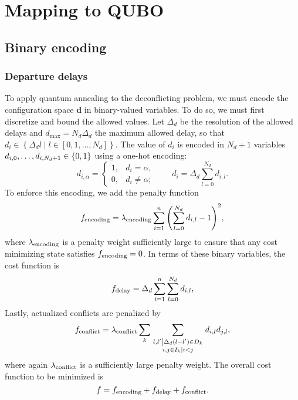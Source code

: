 \section{Mapping to QUBO}

\subsection{Binary encoding}

\subsubsection{Departure delays}
\label{sec:departure_delay_model}

To apply quantum annealing to the deconflicting problem, we must encode the configuration space $\mathbf d$ in binary-valued variables.
To do so, we must first discretize and bound the allowed values.
Let $\Delta_d$ be the resolution of the allowed delays and $d_{\max} = N_d \Delta_d$ the maximum allowed delay, so that $d_i \in \left\{\Delta_d l \middle| l \in [0, 1, \ldots, N_d]\right\}$.
The value of $d_i$ is encoded in $N_d + 1$ variables $d_{i,0}, \ldots, d_{i,N_d + 1} \in {\{0, 1\}}$ using a one-hot encoding:
\begin{equation}
d_{i, \alpha} = \begin{cases}
1, & d_i = \alpha,\\
0, & d_i \neq \alpha;
\end{cases}
\qquad
d_i = \Delta_d \sum_{l = 0}^{N_d} d_{i,l}.
\end{equation}
To enforce this encoding, we add the penalty function
\begin{equation}
f_{\mathrm{encoding}} = 
\lambda_{\mathrm{encoding}} 
\sum_{i = 1}^n 
{\left(
\sum_{l = 0}^{N_d} d_{i,l} - 1
\right)}^2,
\end{equation}
where $\lambda_{\mathrm{encoding}}$ is a penalty weight sufficiently large to ensure that any cost minimizing state satisfies $f_{\mathrm{encoding}} = 0$.
In terms of these binary variables, the cost function is 
\begin{equation}
f_{\mathrm{delay}} = 
\Delta_d
\sum_{i=1}^n 
\sum_{l=0}^{N_d} d_{i,l},
\end{equation}
Lastly, actualized conflicts are penalized by 
\begin{equation}
  f_{\mathrm{conflict}}
=
\lambda_{\mathrm{conflict}}
\sum_{k}
\sum_{\substack{\left.l, l' \middle| \Delta_d (l - l') \in D_k\right.\\
\left. i, j \in I_k \middle| i < j \right.}}
  d_{i,l} d_{j, l},
\end{equation}
where again $\lambda_{\mathrm{conflict}}$ is a sufficiently large penalty weight. 
The overall cost function to be minimized is 
\begin{equation}
f
=
f_{\mathrm{encoding}} + f_{\mathrm{delay}} + f_{\mathrm{conflict}}.
\end{equation}



